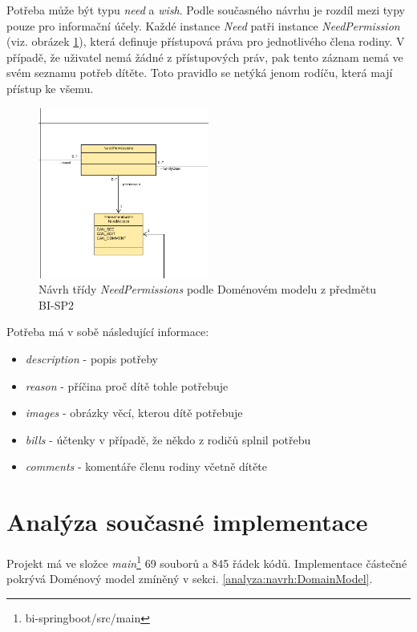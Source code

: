         Potřeba může být typu \textit{need} a \textit{wish}. Podle současného návrhu je rozdíl mezi typy pouze pro informační účely. Každé instance \textit{Need} patři instance \textit{NeedPermission} (viz. obrázek \ref{image:NeedPermissions1}), která definuje přístupová práva pro jednotlivého člena rodiny. V případě, že uživatel nemá žádné z přístupových práv, pak tento záznam nemá ve svém seznamu potřeb dítěte. Toto pravidlo se netýká jenom rodíču, která mají pŕístup ke všemu. 
        \begin{figure}\centering
	        \includegraphics[width=0.5\textwidth]{pdfs/NeedPermissions1}
	        \caption[Návrh NeedPermissions]{Návrh třídy \textit{NeedPermissions} podle Doménovém modelu z předmětu BI-SP2}\label{image:NeedPermissions1}
        \end{figure}
       
       Potřeba má v sobě následující informace:
        \begin{itemize}
            \item \textit{description} - popis potřeby
            \item \textit{reason} - příčina proč dítě tohle potřebuje
            \item \textit{images} - obrázky věcí, kterou dítě potřebuje
            \item \textit{bills} - účtenky v případě, že někdo z rodičů splnil potřebu
            \item \textit{comments} - komentáře členu rodiny včetně dítěte
        \end{itemize}
     
\section{Analýza současné implementace}\label{analyza:soucasnaImplementace}
    Projekt má ve složce \textit{main}\footnote{bi-springboot/src/main} 69 souborů a 845 řádek kódů. Implementace částečné pokrývá Doménový model zmíněný v sekci. \ref{analyza:navrh:DomainModel}.
        
